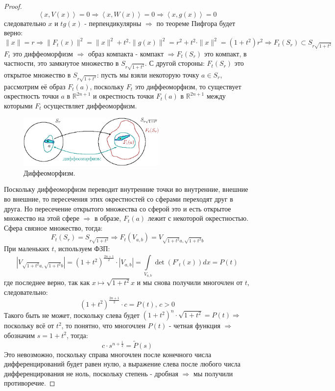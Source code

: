 \documentclass[12pt]{article}
\newcommand{\MR}{\mathbb{R}}
\theoremstyle{definition}
\newcommand{\ddint}[2]{\displaystyle\int\limits_{#1}^{#2}}
\newcommand{\inner}[2]{\left\langle #1, #2 \right\rangle }
\newcommand{\wte}[1]{\widetilde{#1}}
\begin{document}
\begin{proof}
	$$
		\inner{x}{V(x)} = 0 \Rightarrow \inner{x}{W(x)} = 0 \Rightarrow \inner{x}{g(x)} = 0
	$$ 
	следовательно $x$ и $tg(x)$ - перпендикулярны $\Rightarrow$ по теореме Пифгора будет верно:
	$$
		\|x \| =r \Rightarrow \|F_t(x)\|^2  = \|x\|^2 + t^2{\cdot}\|g(x)\|^2 = r^2 + t^2{\cdot}\|x\|^2 = (1 + t^2)r^2 \Rightarrow F_t(S_r) \subset S_{r\sqrt{1 + t^2}}
	$$
	$F_t$ это диффеоморфизм $\Rightarrow$ образ компакта - компакт $\Rightarrow F_t(S_r)$ это компакт, в частности, это замкнутое множество в $S_{r\sqrt{1 + t^2}}$. С другой стороны: $F_t(S_r)$ это открытое множество в $S_{r\sqrt{1 + t^2}}$: пусть мы взяли некоторую точку $a \in S_r$, рассмотрим её образ $F_t(a)$, поскольку $F_t$ это диффеоморфизм, то существует окрестность точки $a$ в $\MR^{2n+1}$ и окрестность точки $F_t(a)$ в $\MR^{2n+1}$ между которыми $F_t$ осуществляет диффеоморфизм.
	\begin{figure}[H]
		\centering
		\includegraphics[width=0.65\textwidth]{MA4L8_3.eps}
		\caption{Диффеоморфизм.}
		\label{8_3}
	\end{figure}
	Поскольку диффеоморфизм переводит внутренние точки во внутренние, внешние во внешние, то пересечения этих окрестностей со сферами переходят друг в друга. Но пересечение открытого множества со сферой это и есть открытое множество на этой сфере $\Rightarrow$ в образе, $F_t(a)$ лежит с некоторой окрестностью.
	Сфера связное множество, тогда: 
	$$
		F_t(S_r) = S_{r\sqrt{1 + t^2}} \Rightarrow F_t(V_{a,b}) = V_{\sqrt{1+ t^2}a, \sqrt{1 + t^2}b}
	$$ 
	При маленьких $t$, используем ФЗП:
	$$
		|V_{\sqrt{1+ t^2}a, \sqrt{1 + t^2}b}| = (1 + t^2)^{\tfrac{2n + 1}{2} }{\cdot}|V_{a,b}| = \ddint{V_{a,b}}{}\det{(F'_t(x))}dx = P(t)
	$$
	где последнее верно, так как $x \mapsto \sqrt{1 + t^2}x$ и мы снова получили многочлен от $t$, следовательно:
	$$
		(1 + t^2)^{\tfrac{2n + 1}{2} }{\cdot}c = P(t), \, c > 0
	$$
	Такого быть не может, поскольку слева будет $(1 + t^2)^n{\cdot}\sqrt{1 + t^2} = P(t) \Rightarrow$ поскольку всё от $t^2$, то понятно, что многочлен $P(t)$ - четная функция $\Rightarrow$ обозначим $s = 1 + t^2$, тогда:
	$$
		c{\cdot}s^{n + \tfrac{1}{2}} = \wte{P}(s)
	$$
	Это невозможно, поскольку справа многочлен после конечного числа дифференцирований будет равен нулю, а выражение слева после любого числа дифференцирования не ноль, поскольку степень - дробная $\Rightarrow$ мы получили противоречие.
\end{proof}
\end{document}
